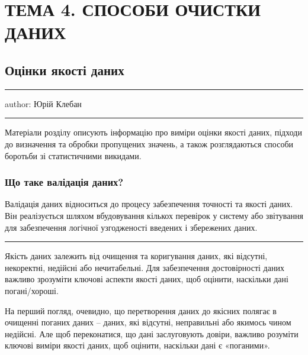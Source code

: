 \documentclass[
  letterpaper,
  DIV=11,
  numbers=noendperiod]{scrreprt}
\begin{document}
\part{ТЕМА 4. СПОСОБИ ОЧИСТКИ ДАНИХ}

\chapter{Оцінки якості
даних}\label{ux43eux446ux456ux43dux43aux438-ux44fux43aux43eux441ux442ux456-ux434ux430ux43dux438ux445}

\begin{center}\rule{0.5\linewidth}{0.5pt}\end{center}

author: Юрій Клебан

\begin{center}\rule{0.5\linewidth}{0.5pt}\end{center}

Матеріали розділу описують інформацію про виміри оцінки якості даних,
підходи до визначення та обробки пропущених значень, а також
розглядаються способи боротьби зі статистичними викидами.

\section{Що таке валідація
даних?}\label{ux449ux43e-ux442ux430ux43aux435-ux432ux430ux43bux456ux434ux430ux446ux456ux44f-ux434ux430ux43dux438ux445}

Валідація даних відноситься до процесу забезпечення точності та якості
даних. Він реалізується шляхом вбудовування кількох перевірок у систему
або звітування для забезпечення логічної узгодженості введених і
збережених даних.

\begin{center}\rule{0.5\linewidth}{0.5pt}\end{center}

Якість даних залежить від очищення та коригування даних, які відсутні,
некоректні, недійсні або нечитабельні. Для забезпечення достовірності
даних важливо зрозуміти ключові аспекти якості даних, щоб оцінити,
наскільки дані погані/хороші.

На перший погляд, очевидно, що перетворення даних до якісних полягає в
очищенні поганих даних -- даних, які відсутні, неправильні або якимось
чином недійсні. Але щоб переконатися, що дані заслуговують довіри,
важливо розуміти ключові виміри якості даних, щоб оцінити, наскільки
дані є «поганими».
\end{document}
